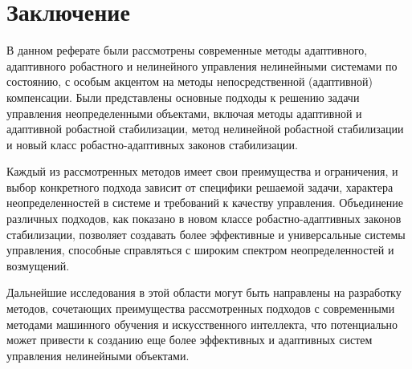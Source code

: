\documentclass[a4paper,14pt]{extarticle} %
\begin{document}
\section{Заключение}

В данном реферате были рассмотрены современные методы адаптивного, адаптивного робастного и нелинейного управления нелинейными системами по состоянию, с особым акцентом на методы непосредственной (адаптивной) компенсации. Были представлены основные подходы к решению задачи управления неопределенными объектами, включая методы адаптивной и адаптивной робастной стабилизации, метод нелинейной робастной стабилизации и новый класс робастно-адаптивных законов стабилизации.

Каждый из рассмотренных методов имеет свои преимущества и ограничения, и выбор конкретного подхода зависит от специфики решаемой задачи, характера неопределенностей в системе и требований к качеству управления. Объединение различных подходов, как показано в новом классе робастно-адаптивных законов стабилизации, позволяет создавать более эффективные и универсальные системы управления, способные справляться с широким спектром неопределенностей и возмущений.

Дальнейшие исследования в этой области могут быть направлены на разработку методов, сочетающих преимущества рассмотренных подходов с современными методами машинного обучения и искусственного интеллекта, что потенциально может привести к созданию еще более эффективных и адаптивных систем управления нелинейными объектами.
\end{document}
